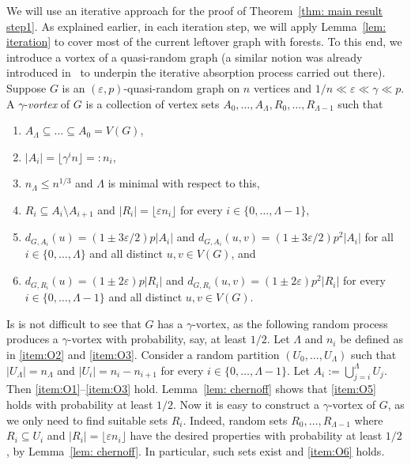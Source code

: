 \documentclass[a4paper, 11pt, reqno]{amsart}
\numberwithin{equation}{section}
\newcommand{\1}{{\rm 1\hspace*{-0.4ex}%
\rule{0.1ex}{1.52ex}\hspace*{0.2ex}}}
\renewcommand{\epsilon}{\varepsilon}
\newcommand{\sm}{\setminus}
\newcommand{\sub}{\subseteq}
\newcounter{step}
\begin{document}
We will use an iterative approach for the proof of Theorem~\ref{thm: main result step1}.
As explained earlier,
in each iteration step,
we will apply Lemma~\ref{lem: iteration} to cover most of the current leftover graph with forests.
To this end, we introduce a vortex of a quasi-random graph 
(a similar notion was already introduced in~\cite{GKLMO16} to underpin the iterative absorption process carried out there).
Suppose $G$ is an $(\epsilon,p)$-quasi-random graph on $n$ vertices and $1/n\ll\epsilon\ll\gamma\ll p$.
A $\gamma$-\emph{vortex} of $G$ is a collection of vertex sets $A_0,\ldots, A_\Lambda, R_0,\ldots, R_{\Lambda-1}$
such that
\begin{enumerate}[label=(V\arabic*)]
	\item\label{item:O1} $A_\Lambda \sub \ldots \sub A_0=V(G)$,
	\item\label{item:O2} $|A_{i}|=\lfloor\gamma^in\rfloor=:n_i$,
	\item\label{item:O3} $n_\Lambda\leq n^{1/3}$ and $\Lambda$ is minimal with respect to this,
	\item\label{item:O4} $R_i\sub A_i\sm A_{i+1}$ and $|R_i|=\lfloor\epsilon n_i\rfloor$ for every $i \in\{0,\ldots, \Lambda-1\}$, 
	\item\label{item:O5} $d_{G,A_i}(u)= (1\pm 3\epsilon/2)p|A_i|$ and $d_{G,A_i}(u,v)= (1\pm 3\epsilon/2)p^2|A_i|$
	for all $i\in \{0,\ldots, \Lambda\}$ and  all distinct $u,v\in V(G)$, and
	\item\label{item:O6} $d_{G,R_i}(u)= (1\pm 2\epsilon)p|R_i|$ and $d_{G,R_i}(u,v)= (1\pm 2\epsilon)p^2|R_i|$
	for every $i\in \{0,\ldots, \Lambda-1\}$ and all distinct $u,v\in V(G)$.
\end{enumerate}

Is is not difficult to see that $G$ has a $\gamma$-vortex,
as the following random process produces a $\gamma$-vortex with probability, say, at least $1/2$.
Let $\Lambda$ and $n_i$ be defined as in \ref{item:O2} and \ref{item:O3}.
Consider a random partition $(U_0,\ldots,U_\Lambda)$
such that $|U_\Lambda|=n_\Lambda$ and 
$|U_i|=n_i-n_{i+1}$ for every $i \in\{0,\ldots, \Lambda-1\}$.
Let $A_i:=\bigcup_{j=i}^\Lambda U_j$. 
Then \ref{item:O1}--\ref{item:O3} hold.
Lemma~\ref{lem: chernoff} shows that \ref{item:O5} holds with probability at least $1/2$.
Now it is easy to construct a $\gamma$-vortex of $G$, as we only need to find suitable sets $R_i$.
Indeed, random sets $R_0,\ldots, R_{\Lambda-1}$ where $R_i\sub U_i$ and $|R_i|=\lfloor\epsilon n_i\rfloor$ have the desired properties with probability at least $1/2$, by Lemma~\ref{lem: chernoff}.
In particular, such sets exist and \ref{item:O6} holds.
 
\end{document}
